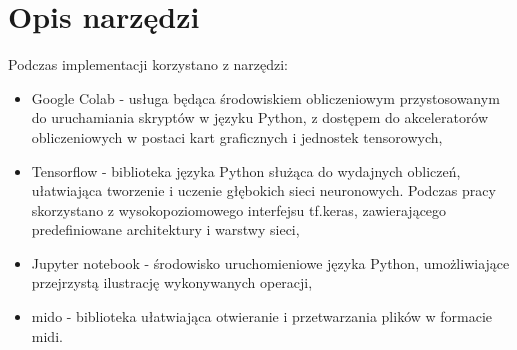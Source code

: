 {  \section{Opis narzędzi}
  {
    Podczas implementacji korzystano z narzędzi:
    \begin{itemize}
      \item Google Colab - usługa będąca środowiskiem obliczeniowym przystosowanym 
      do uruchamiania skryptów w języku Python, z dostępem do akceleratorów obliczeniowych
      w postaci kart graficznych i jednostek tensorowych,
      \item Tensorflow - biblioteka języka Python służąca do wydajnych obliczeń, ułatwiająca 
      tworzenie i uczenie głębokich sieci neuronowych. Podczas pracy skorzystano z 
      wysokopoziomowego interfejsu tf.keras, zawierającego predefiniowane architektury i warstwy sieci,
      \item Jupyter notebook - środowisko uruchomieniowe języka Python, umożliwiające przejrzystą
      ilustrację wykonywanych operacji,
      \item mido - biblioteka ułatwiająca otwieranie i przetwarzania plików w formacie midi.
    \end{itemize}
  }
}